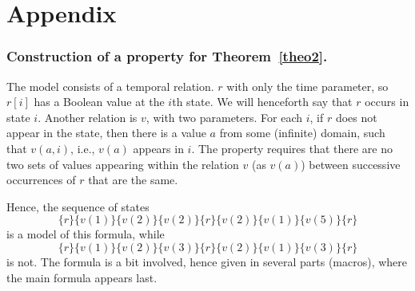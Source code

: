 \documentclass{llncs}
\begin{document}













\newpage
\appendix

\section{Appendix}


\subsubsection{Construction of a property
for Theorem~\ref{theo2}.}
The model consists of
a temporal relation.
$r$ with only the time parameter, so $r [ i ]$
has a Boolean value at the $i$th state. We will henceforth say that $r$ occurs
in state $i$. Another relation is $v$, with
two parameters. For each $i$, if $r$ does not appear in the
state, 
then there is a value $a$ from some (infinite) domain,
such that $v ( a, i )$, 
i.e., $v(a)$ appears in $i$.
The property requires that there are no two sets of values appearing within the relation $v$ (as $v(a)$) between successive occurrences of $r$ that are the same.


Hence, the sequence of states 
\[ \{ r \} \{ v(1) \}  \{ v(2) \}  \{ v(2) \}  \{ r\}  \{ v(2) \}  \{  v(1) \}  \{  v(5) \}  \{  r \}\]
is a model of this formula, while 
\[ \{ r \} \{ v(1) \}  \{ v(2) \} \{ v(3) \}  \{ r\}  \{ v(2) \}  \{  v(1) \}  \{  v(3) \} \{  r \} \]
is not.
The \QFLTL{} formula is a bit involved, hence given in several parts (macros), where the main formula appears last.
\end{document}
